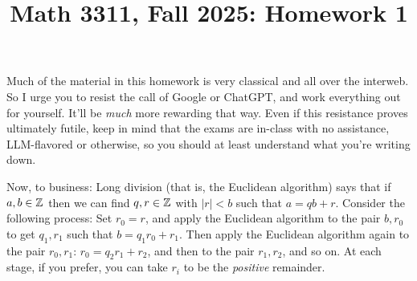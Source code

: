\documentclass{amsart}
\title{Math 3311, Fall 2025: Homework 1}
\begin{document}
\maketitle

Much of the material in this homework is very classical and all over the interweb. So I urge you to resist the call of Google or ChatGPT, and work everything out for yourself. It'll be \emph{much} more rewarding that way. Even if this resistance proves ultimately futile, keep in mind that the exams are in-class with no assistance, LLM-flavored or otherwise, so you should at least understand what you're writing down.

Now, to business: Long division (that is, the Euclidean algorithm) says that if $a,b\in \mathbb{Z}$ then we can find $q,r\in\mathbb{Z}$ with $|r|<b$ such that $a = qb + r$. Consider the following process: Set $r_0 = r$, and apply the Euclidean algorithm to the pair $b,r_0$ to get $q_1,r_1$ such that $b = q_1r_0 + r_1$. Then apply the Euclidean algorithm again to the pair $r_0,r_1$: $r_0 = q_2r_1 + r_2$, and then to the pair $r_1,r_2$, and so on. At each stage, if you prefer, you can take $r_i$ to be the \emph{positive} remainder. 
\end{document}
